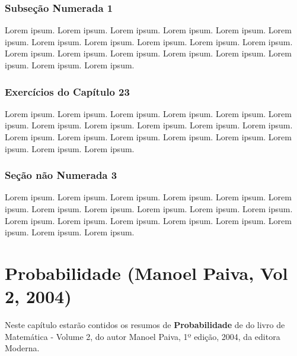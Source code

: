 \documentclass[
]{book}
\begin{document}
\hypertarget{subseuxe7uxe3o-numerada-1-4}{%
\subsection{Subseção Numerada 1}\label{subseuxe7uxe3o-numerada-1-4}}

Lorem ipsum. Lorem ipsum. Lorem ipsum. Lorem ipsum. Lorem ipsum. Lorem ipsum. Lorem ipsum. Lorem ipsum. Lorem ipsum. Lorem ipsum. Lorem ipsum. Lorem ipsum. Lorem ipsum. Lorem ipsum. Lorem ipsum. Lorem ipsum. Lorem ipsum. Lorem ipsum. Lorem ipsum.

\hypertarget{exercuxedcios-do-capuxedtulo-23-1}{%
\subsection{Exercícios do Capítulo 23}\label{exercuxedcios-do-capuxedtulo-23-1}}

Lorem ipsum. Lorem ipsum. Lorem ipsum. Lorem ipsum. Lorem ipsum. Lorem ipsum. Lorem ipsum. Lorem ipsum. Lorem ipsum. Lorem ipsum. Lorem ipsum. Lorem ipsum. Lorem ipsum. Lorem ipsum. Lorem ipsum. Lorem ipsum. Lorem ipsum. Lorem ipsum. Lorem ipsum.

\hypertarget{seuxe7uxe3o-nuxe3o-numerada-3-4}{%
\subsection*{Seção não Numerada 3}\label{seuxe7uxe3o-nuxe3o-numerada-3-4}}

Lorem ipsum. Lorem ipsum. Lorem ipsum. Lorem ipsum. Lorem ipsum. Lorem ipsum. Lorem ipsum. Lorem ipsum. Lorem ipsum. Lorem ipsum. Lorem ipsum. Lorem ipsum. Lorem ipsum. Lorem ipsum. Lorem ipsum. Lorem ipsum. Lorem ipsum. Lorem ipsum. Lorem ipsum.

\hypertarget{probabilidade-manoel-paiva-vol-2-2004}{%
\chapter{Probabilidade (Manoel Paiva, Vol 2, 2004)}\label{probabilidade-manoel-paiva-vol-2-2004}}

Neste capítulo estarão contidos os resumos de \textbf{Probabilidade} de do livro de Matemática - Volume 2, do autor Manoel Paiva, 1º edição, 2004, da editora Moderna.
\end{document}
